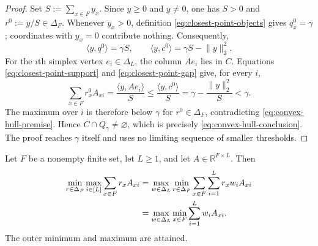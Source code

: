 \begin{proof}
Set $S:=\sum_{x\in F}y_x$.  Since $y\ge0$ and $y\ne0$, one has
$S>0$ and $r^0:=y/S\in\Delta_F$.  Whenever $y_x>0$, definition
\eqref{eq:closest-point-objects} gives $q_x^0=\gamma$; coordinates with
$y_x=0$ contribute nothing.  Consequently,
\begin{equation}\label{eq:closest-point-gap}
\langle y,q^0\rangle=\gamma S,\qquad
\langle y,c^0\rangle=\gamma S-\lVert y\rVert_2^2.
\end{equation}
For the $i$th simplex vertex $e_i\in\Delta_L$, the column $Ae_i$ lies in
$C$.  Equations \eqref{eq:closest-point-support} and
\eqref{eq:closest-point-gap} give, for every $i$,
\[
\sum_{x\in F}r_x^0A_{xi}
=\frac{\langle y,Ae_i\rangle}{S}
\le\frac{\langle y,c^0\rangle}{S}
=\gamma-\frac{\lVert y\rVert_2^2}{S}
<\gamma.
\]
The maximum over $i$ is therefore below $\gamma$ for
$r^0\in\Delta_F$, contradicting \eqref{eq:convex-hull-premise}.  Hence
$C\cap Q_\gamma\ne\varnothing$, which is precisely
\eqref{eq:convex-hull-conclusion}.  The proof reaches $\gamma$ itself and
uses no limiting sequence of smaller thresholds.
\end{proof}

\begin{proposition}
\label{prop:step-003-finite-minimax}
Let $F$ be a nonempty finite set, let $L\ge1$, and let
$A\in\mathbb R^{F\times L}$.  Then
\begin{align}
\min_{r\in\Delta_F}\max_{i\in[L]}
\sum_{x\in F}r_xA_{xi}
&=\max_{w\in\Delta_L}\min_{r\in\Delta_F}
\sum_{x\in F}\sum_{i=1}^Lr_xw_iA_{xi}\notag\\
&=\max_{w\in\Delta_L}\min_{x\in F}
\sum_{i=1}^Lw_iA_{xi}.
\label{eq:finite-minimax}
\end{align}
The outer minimum and maximum are attained.
\end{proposition}

